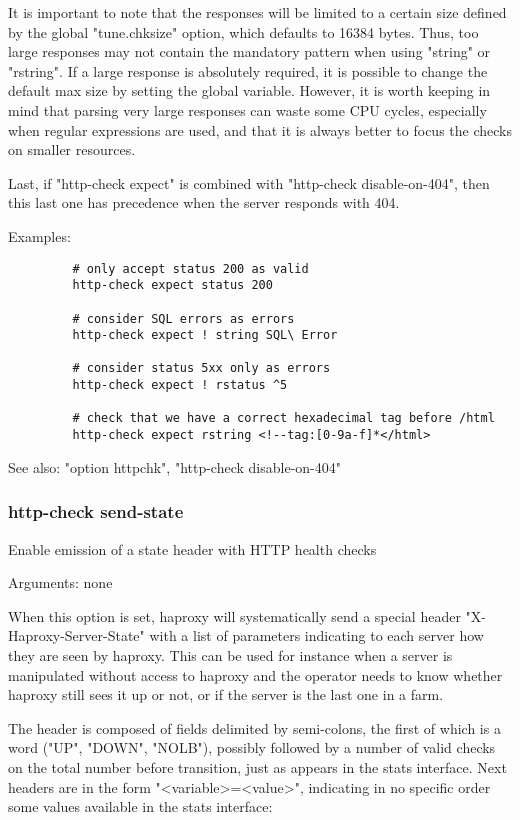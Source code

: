   It is important to note that the responses will be limited to a certain size
  defined by the global "tune.chksize" option, which defaults to 16384 bytes.
  Thus, too large responses may not contain the mandatory pattern when using
  "string" or "rstring". If a large response is absolutely required, it is
  possible to change the default max size by setting the global variable.
  However, it is worth keeping in mind that parsing very large responses can
  waste some CPU cycles, especially when regular expressions are used, and that
  it is always better to focus the checks on smaller resources.

  Last, if "http-check expect" is combined with "http-check disable-on-404",
  then this last one has precedence when the server responds with 404.

  Examples:
  \begin{verbatim}
         # only accept status 200 as valid
         http-check expect status 200

         # consider SQL errors as errors
         http-check expect ! string SQL\ Error

         # consider status 5xx only as errors
         http-check expect ! rstatus ^5

         # check that we have a correct hexadecimal tag before /html
         http-check expect rstring <!--tag:[0-9a-f]*</html>
  \end{verbatim}

  See also: "option httpchk", "http-check disable-on-404"

\subsubsection[http-check send-state]{http-check send-state}
  Enable emission of a state header with HTTP health checks
  
  
  Arguments: none

  When this option is set, haproxy will systematically send a special header
  "X-Haproxy-Server-State" with a list of parameters indicating to each server
  how they are seen by haproxy. This can be used for instance when a server is
  manipulated without access to haproxy and the operator needs to know whether
  haproxy still sees it up or not, or if the server is the last one in a farm.

  The header is composed of fields delimited by semi-colons, the first of which
  is a word ("UP", "DOWN", "NOLB"), possibly followed by a number of valid
  checks on the total number before transition, just as appears in the stats
  interface. Next headers are in the form "<variable>=<value>", indicating in
  no specific order some values available in the stats interface:
  

